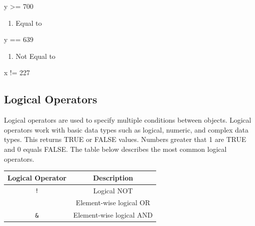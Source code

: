 \documentclass[
  letterpaper,
  DIV=11,
  numbers=noendperiod]{scrreprt}
\newenvironment{Shaded}{}{}
\newcommand{\DecValTok}[1]{\textcolor[rgb]{0.00,0.36,0.77}{#1}}
\newcommand{\NormalTok}[1]{\textcolor[rgb]{0.14,0.16,0.18}{#1}}
\newcommand{\SpecialCharTok}[1]{\textcolor[rgb]{0.00,0.36,0.77}{#1}}
\providecommand{\tightlist}{%
  \setlength{\itemsep}{0pt}\setlength{\parskip}{0pt}}\usepackage{longtable,booktabs,array}
\begin{document}
\begin{Shaded}
\begin{Highlighting}[]
\NormalTok{y }\SpecialCharTok{\textgreater{}=} \DecValTok{700}
\end{Highlighting}
\end{Shaded}

\begin{enumerate}
\def\labelenumi{\alph{enumi}.}
\setcounter{enumi}{4}
\tightlist
\item
  Equal to
\end{enumerate}

\begin{Shaded}
\begin{Highlighting}[]
\NormalTok{y }\SpecialCharTok{==} \DecValTok{639}
\end{Highlighting}
\end{Shaded}

\begin{enumerate}
\def\labelenumi{\alph{enumi}.}
\setcounter{enumi}{5}
\tightlist
\item
  Not Equal to
\end{enumerate}

\begin{Shaded}
\begin{Highlighting}[]
\NormalTok{x }\SpecialCharTok{!=} \DecValTok{227}
\end{Highlighting}
\end{Shaded}

\subsection{Logical Operators}\label{logical-operators}

Logical operators are used to specify multiple conditions between
objects. Logical operators work with basic data types such as logical,
numeric, and complex data types. This returns TRUE or FALSE values.
Numbers greater that 1 are TRUE and 0 equals FALSE. The table below
describes the most common logical operators.

\begin{longtable}[]{@{}cc@{}}
\toprule\noalign{}
Logical Operator & Description \\
\midrule\noalign{}
\endhead
\bottomrule\noalign{}
\endlastfoot
\texttt{!} & Logical NOT \\
\texttt{\textbar{}} & Element-wise logical OR \\
\texttt{\&} & Element-wise logical AND \\
\end{longtable}
\end{document}
